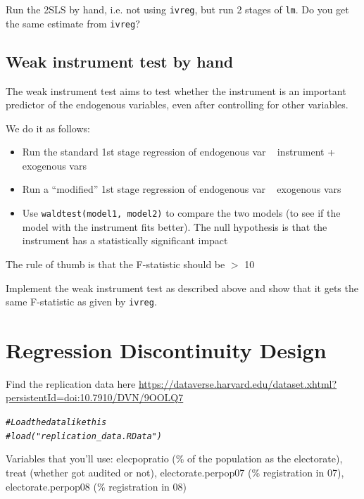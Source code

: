 \documentclass{article}\usepackage[]{graphicx}\usepackage[]{color}
\makeatletter
\newcommand{\hlcom}[1]{\textcolor[rgb]{0.678,0.584,0.686}{\textit{#1}}}%
\newenvironment{kframe}{%
 \def\at@end@of@kframe{}%
 \ifinner\ifhmode%
  \def\at@end@of@kframe{\end{minipage}}%
  \begin{minipage}{\columnwidth}%
 \fi\fi%
 \def\FrameCommand##1{\hskip\@totalleftmargin \hskip-\fboxsep
 \colorbox{shadecolor}{##1}\hskip-\fboxsep
     \hskip-\linewidth \hskip-\@totalleftmargin \hskip\columnwidth}%
 \MakeFramed {\advance\hsize-\width
   \@totalleftmargin\z@ \linewidth\hsize
   \@setminipage}}%
 {\par\unskip\endMakeFramed%
 \at@end@of@kframe}
\newenvironment{knitrout}{}{} %
\makeatother
\begin{document}
Run the 2SLS by hand, i.e. not using \verb`ivreg`, but run 2 stages of \verb`lm`. Do you get the same estimate from \verb`ivreg`?

\subsection{Weak instrument test by hand}

The weak instrument test aims to test whether the instrument is an important predictor of the endogenous variables, even after controlling for other variables.

We do it as follows:

\begin{itemize}
\item Run the standard 1st stage regression of endogenous var ~ instrument + exogenous vars
\item Run a ``modified'' 1st stage regression of endogenous var ~ exogenous vars
\item Use \verb`waldtest(model1, model2)` to compare the two models (to see if the model with the instrument fits better). The null hypothesis is that the instrument has a statistically significant impact
\end{itemize}
The rule of thumb is that the F-statistic should be $>$ 10

Implement the weak instrument test as described above and show that it gets the same F-statistic as given by \verb`ivreg`.

\section{Regression Discontinuity Design}

Find the replication data here \url{https://dataverse.harvard.edu/dataset.xhtml?persistentId=doi:10.7910/DVN/9OOLQ7}

\begin{knitrout}
\color{fgcolor}\begin{kframe}
\begin{alltt}
\hlcom{# Load the data like this}
\hlcom{# load("replication_data.RData")}
\end{alltt}
\end{kframe}
\end{knitrout}

Variables that you'll use: elecpopratio (\% of the population as the electorate), treat (whether got audited or not), electorate.perpop07 (\% registration in 07), electorate.perpop08 (\% registration in 08)
\end{document}
